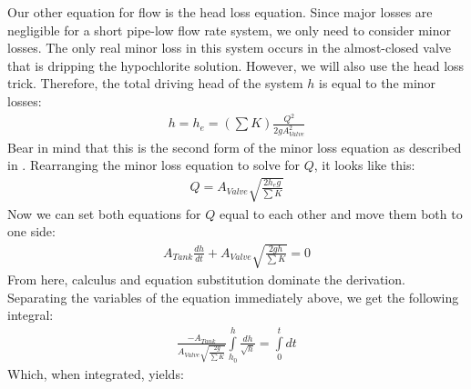 \documentclass[letterpaper,10pt,english]{sphinxmanual}
\begin{document}
Our other equation for flow is the head loss equation. Since major losses are negligible for a short pipe-low flow rate system, we only need to consider minor losses. The only real minor loss in this system occurs in the almost-closed valve that is dripping the hypochlorite solution. However, we will also use the head loss trick. Therefore, the total driving head of the system \(h\) is equal to the minor losses:
\begin{equation}\label{equation:Flow_Control_and_Measurement/FCM_Derivations:Flow_Control_and_Measurement/FCM_Derivations:1}
\begin{split}h = h_e = \left( \sum K \right) \frac{Q^2}{2gA_{Valve}^2}\end{split}
\end{equation}
Bear in mind that this is the second form of the minor loss equation as described in {\hyperref[\detokenize{Review/Review_Fluid_Mechanics_Derivations:heading-final-minor-loss-equations}]{}}. Rearranging the minor loss equation to solve for \(Q\), it looks like this:
\begin{equation}\label{equation:Flow_Control_and_Measurement/FCM_Derivations:Flow_Control_and_Measurement/FCM_Derivations:2}
\begin{split}Q = A_{Valve} \sqrt{\frac{2 h_e g}{\sum K}}\end{split}
\end{equation}
Now we can set both equations for \(Q\) equal to each other and move them both to one side:
\begin{equation}\label{equation:Flow_Control_and_Measurement/FCM_Derivations:Flow_Control_and_Measurement/FCM_Derivations:3}
\begin{split}A_{Tank} \frac{dh}{dt} + A_{Valve} \sqrt{\frac{2gh}{\sum K}} = 0\end{split}
\end{equation}
From here, calculus and equation substitution dominate the derivation. Separating the variables of the equation immediately above, we get the following integral:
\begin{equation}\label{equation:Flow_Control_and_Measurement/FCM_Derivations:Flow_Control_and_Measurement/FCM_Derivations:4}
\begin{split}\frac{ -A_{Tank}}{{A_{Valve}} \sqrt{\frac{2g}{\sum K}} }   \int \limits_{h_0}^h \frac{dh}{\sqrt h} = \int \limits_0^t {dt}\end{split}
\end{equation}
Which, when integrated, yields:
\end{document}
